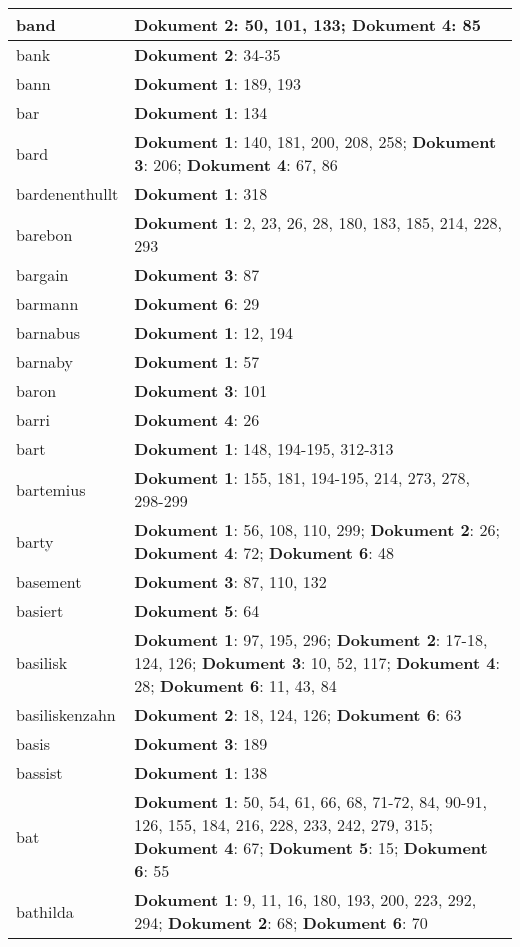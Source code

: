 \documentclass[a5paper]{article}
\begin{document}
\begin{longtable}[l]{|l|p{3in}|}
\hline
band & \textbf{Dokument 2}: 50, 101, 133; \textbf{Dokument 4}: 85 \\
\hline
bank & \textbf{Dokument 2}: 34-35 \\
\hline
bann & \textbf{Dokument 1}: 189, 193 \\
\hline
bar & \textbf{Dokument 1}: 134 \\
\hline
bard & \textbf{Dokument 1}: 140, 181, 200, 208, 258; \textbf{Dokument 3}: 206; \textbf{Dokument 4}: 67, 86 \\
\hline
bardenenthullt & \textbf{Dokument 1}: 318 \\
\hline
barebon & \textbf{Dokument 1}: 2, 23, 26, 28, 180, 183, 185, 214, 228, 293 \\
\hline
bargain & \textbf{Dokument 3}: 87 \\
\hline
barmann & \textbf{Dokument 6}: 29 \\
\hline
barnabus & \textbf{Dokument 1}: 12, 194 \\
\hline
barnaby & \textbf{Dokument 1}: 57 \\
\hline
baron & \textbf{Dokument 3}: 101 \\
\hline
barri & \textbf{Dokument 4}: 26 \\
\hline
bart & \textbf{Dokument 1}: 148, 194-195, 312-313 \\
\hline
bartemius & \textbf{Dokument 1}: 155, 181, 194-195, 214, 273, 278, 298-299 \\
\hline
barty & \textbf{Dokument 1}: 56, 108, 110, 299; \textbf{Dokument 2}: 26; \textbf{Dokument 4}: 72; \textbf{Dokument 6}: 48 \\
\hline
basement & \textbf{Dokument 3}: 87, 110, 132 \\
\hline
basiert & \textbf{Dokument 5}: 64 \\
\hline
basilisk & \textbf{Dokument 1}: 97, 195, 296; \textbf{Dokument 2}: 17-18, 124, 126; \textbf{Dokument 3}: 10, 52, 117; \textbf{Dokument 4}: 28; \textbf{Dokument 6}: 11, 43, 84 \\
\hline
basiliskenzahn & \textbf{Dokument 2}: 18, 124, 126; \textbf{Dokument 6}: 63 \\
\hline
basis & \textbf{Dokument 3}: 189 \\
\hline
bassist & \textbf{Dokument 1}: 138 \\
\hline
bat & \textbf{Dokument 1}: 50, 54, 61, 66, 68, 71-72, 84, 90-91, 126, 155, 184, 216, 228, 233, 242, 279, 315; \textbf{Dokument 4}: 67; \textbf{Dokument 5}: 15; \textbf{Dokument 6}: 55 \\
\hline
bathilda & \textbf{Dokument 1}: 9, 11, 16, 180, 193, 200, 223, 292, 294; \textbf{Dokument 2}: 68; \textbf{Dokument 6}: 70 \\

\end{longtable}
\end{document}
